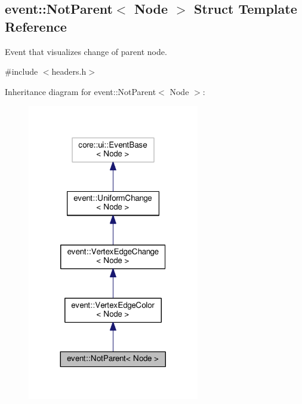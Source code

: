 \hypertarget{structevent_1_1NotParent}{}\subsection{event\+:\+:Not\+Parent$<$ Node $>$ Struct Template Reference}
\label{structevent_1_1NotParent}


Event that visualizes change of parent node.  




{\ttfamily \#include $<$headers.\+h$>$}



Inheritance diagram for event\+:\+:Not\+Parent$<$ Node $>$\+:\nopagebreak
\begin{figure}[H]
\begin{center}
\leavevmode
\includegraphics[width=212pt]{structevent_1_1NotParent__inherit__graph}
\end{center}
\end{figure}


